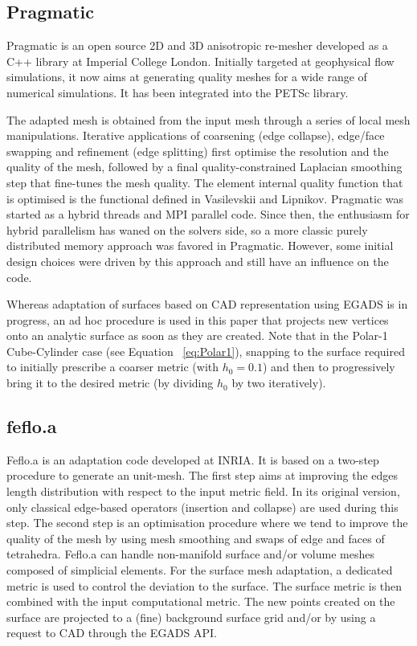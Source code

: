\documentclass[3p,times,procedia,number]{elsarticle}
\begin{document}
\subsection{Pragmatic}

Pragmatic\cite{pragmatic-website,Gorman-2015} is an open source 2D and
3D anisotropic re-mesher developed as a C++ library at Imperial College
London.
Initially targeted at geophysical flow simulations, it now
aims at generating quality meshes for a wide range of numerical
simulations.
It has been integrated into the PETSc library.\cite{petsc-user-ref,Barral-2016}

The adapted mesh is obtained from the input mesh through a series of
local mesh manipulations. Iterative applications of coarsening (edge collapse),
edge/face swapping and refinement (edge splitting) first optimise the
resolution and the quality of the mesh, followed by a final
quality-constrained Laplacian smoothing step that fine-tunes the mesh
quality. The element internal quality function that is optimised is
the functional defined in Vasilevskii and Lipnikov.\cite{Vasilevskii-1999}
Pragmatic was started as a hybrid threads and MPI parallel code. Since
then, the enthusiasm for hybrid parallelism has waned on the solvers side,
so a more classic purely distributed memory approach was favored in 
Pragmatic. However, some initial design 
choices were driven by this approach and still have an influence on the code. 

Whereas adaptation of surfaces based on CAD representation using EGADS
is in progress, an ad hoc procedure is used in this paper that projects 
new vertices onto an analytic surface as soon as they are created.
Note that in the Polar-1 Cube-Cylinder case (see Equation ~\ref{eq:Polar1}), snapping 
to the surface required to initially prescribe a coarser metric (with $h_0 = 0.1$)
and then to progressively bring it to the desired metric (by dividing 
$h_0$ by two iteratively).

\subsection{feflo.a}

Feflo.a is an adaptation code developed at INRIA.
It is based on a two-step procedure to generate an unit-mesh.\cite{loseille-lohner-adapt-boom, loseille-handbook}
The first step aims at improving the edges length distribution
with respect to the input metric field.
In its original version, only classical edge-based operators (insertion and collapse) are used during this step.
The second step is an optimisation procedure where we tend to improve the quality of the mesh by using mesh smoothing
and swaps of edge and faces of tetrahedra.
Feflo.a can handle non-manifold surface and/or volume meshes composed of simplicial elements.
For the surface mesh
adaptation, a dedicated metric is used to control the deviation to the surface.
The surface metric is then combined with the input computational metric.
The new points created on the surface are projected to a (fine) background surface grid and/or by using a request to CAD through the EGADS API.
\end{document}
